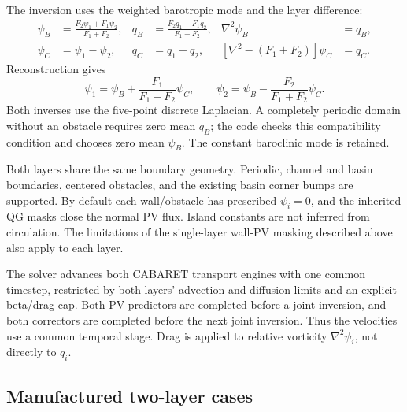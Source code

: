 \documentclass[11pt]{article}
\newcommand{\lap}{\nabla^2}
\begin{document}
The inversion uses the weighted barotropic mode and the layer difference:
\begin{align}
 \psi_B&=\frac{F_2\psi_1+F_1\psi_2}{F_1+F_2},&
 q_B&=\frac{F_2q_1+F_1q_2}{F_1+F_2},&
 \lap\psi_B&=q_B,\\
 \psi_C&=\psi_1-\psi_2,&q_C&=q_1-q_2,&
 [\lap-(F_1+F_2)]\psi_C&=q_C.
\end{align}
Reconstruction gives
\[
 \psi_1=\psi_B+\frac{F_1}{F_1+F_2}\psi_C,\qquad
 \psi_2=\psi_B-\frac{F_2}{F_1+F_2}\psi_C.
\]
Both inverses use the five-point discrete Laplacian.  A completely
periodic domain without an obstacle requires zero mean $q_B$; the code
checks this compatibility condition and chooses zero mean $\psi_B$.
The constant baroclinic mode is retained.

Both layers share the same boundary geometry.  Periodic, channel and basin
boundaries, centered obstacles, and the existing basin corner bumps are
supported. By default each wall/obstacle has prescribed $\psi_i=0$, and the inherited
QG masks close the normal PV flux. Island constants are not inferred from
circulation. The limitations of the single-layer wall-PV masking described
above also apply to each layer.

The solver advances both CABARET transport engines with one common
timestep, restricted by both layers' advection and diffusion limits and
an explicit beta/drag cap. Both PV predictors are completed before a joint
inversion, and both correctors are completed before the next joint
inversion. Thus the velocities use a common temporal stage.
Drag is applied to relative vorticity $\lap\psi_i$, not directly to $q_i$.

\subsection{Manufactured two-layer cases}
\end{document}

